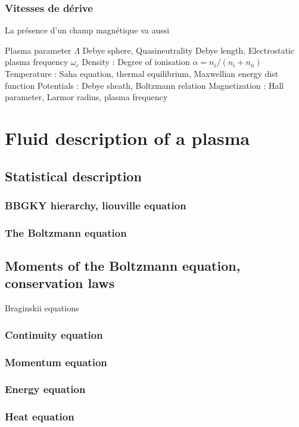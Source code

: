 			\subsubsection{Vitesses de dérive}
			La présence d'un champ magnétique va aussi 
			
		 Plasma parameter $\Lambda$ Debye sphere, Quasineutrality Debye length,
		Electrostatic plasma frequency $\omega_c$
		 Density : Degree of ionisation $\alpha=n_i/(n_i+n_n)$
			Temperature : Saha equation, thermal equilibrium, Maxwellian energy dist function
			Potentials : Debye sheath, Boltzmann relation
			Magnetization : Hall parameter, Larmor radius, plasma frequency
		
	\section{Fluid description of a plasma}
		\subsection{Statistical description}
			\subsubsection{BBGKY hierarchy, liouville equation}
			\subsubsection{The Boltzmann equation}
		\subsection{Moments of the Boltzmann equation, conservation laws}
			Braginskii equations
			\subsubsection{Continuity equation}
			\subsubsection{Momentum equation}
			\subsubsection{Energy equation}
			\subsubsection{Heat equation}

